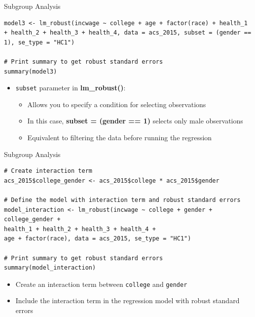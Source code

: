 \documentclass[dvipsnames,hyperref={pdfpagelabels=false}]{beamer}
\begin{document}
\begin{frame}[fragile]{Subgroup Analysis}
\begin{lstlisting}
model3 <- lm_robust(incwage ~ college + age + factor(race) + health_1 + health_2 + health_3 + health_4, data = acs_2015, subset = (gender == 1), se_type = "HC1")

# Print summary to get robust standard errors
summary(model3)
\end{lstlisting}
		\vspace{0.2cm}
	\begin{itemize}
		\item \texttt{subset} parameter in \textbf{lm\_robust()}:
		\vspace{0.2cm}
		\begin{itemize}
			\item Allows you to specify a condition for selecting observations
			\vspace{0.2cm}
			\item In this case, \textbf{subset = (gender == 1)} selects only male observations
			\vspace{0.2cm}
			\item Equivalent to filtering the data before running the regression
		\end{itemize}
		
	\end{itemize}
\end{frame}

\begin{frame}[fragile]{Subgroup Analysis}
\begin{lstlisting}
# Create interaction term
acs_2015$college_gender <- acs_2015$college * acs_2015$gender

# Define the model with interaction term and robust standard errors
model_interaction <- lm_robust(incwage ~ college + gender + college_gender +
health_1 + health_2 + health_3 + health_4 +
age + factor(race), data = acs_2015, se_type = "HC1")

# Print summary to get robust standard errors
summary(model_interaction)
\end{lstlisting}
		\vspace{0.2cm}
	\begin{itemize}
		\item Create an interaction term between \texttt{college} and \texttt{gender}
		\vspace{0.2cm}
		\item Include the interaction term in the regression model with robust standard errors
	\end{itemize}
\end{frame}
\end{document}
